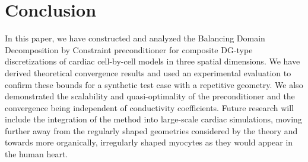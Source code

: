 \section{Conclusion}

In this paper, we have constructed and analyzed the Balancing Domain Decomposition by Constraint preconditioner for composite DG-type discretizations of cardiac cell-by-cell models in three spatial dimensions. We have derived theoretical convergence results and used an experimental evaluation to confirm these bounds for a synthetic test case with a repetitive geometry. We also demonstrated the scalability and quasi-optimality of the preconditioner and the convergence being independent of conductivity coefficients. Future research will include the integration of the method into large-scale cardiac simulations, moving further away from the regularly shaped geometries considered by the theory and towards more organically, irregularly shaped myocytes as they would appear in the human heart.